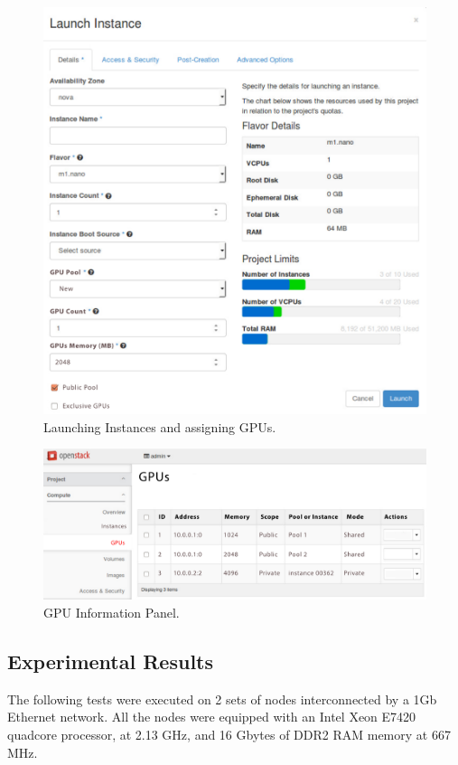 \documentclass[a4paper,twoside]{article}
\begin{document}
\begin{figure}[htb]
  \centering
  \includegraphics[width=\linewidth]{images/UI-launch.pdf}
  \caption{Launching Instances and assigning GPUs.}
  \label{fig:ui-launch}
\end{figure}
  
\begin{figure}[htb]
  \centering
  \includegraphics[width=\linewidth]{images/UI-rgpus.pdf}
  \caption{GPU Information Panel.}
  \label{fig:ui-rgpus}
\end{figure}

\subsection{Experimental Results}
The following tests were executed on 2 sets of nodes interconnected by a 1Gb Ethernet network.
All the nodes were equipped with an Intel Xeon E7420 quadcore processor, at 2.13 GHz, and 16 Gbytes of DDR2 RAM memory at 667 MHz.
\end{document}

